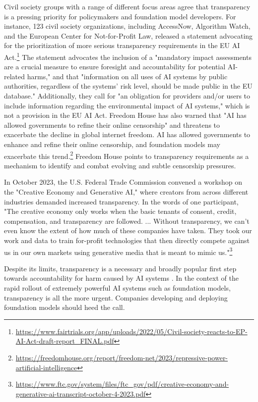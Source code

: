 \documentclass[screen, authorversion, acmsmall]{acmart}
\begin{document}
Civil society groups with a range of different focus areas agree that transparency is a pressing priority for policymakers and foundation model developers.
For instance, 123 civil society organizations, including AccessNow, Algorithm Watch, and the European Center for Not-for-Profit Law, released a statement advocating for the prioritization of more serious transparency requirements in the EU AI Act.\footnote{\url{https://www.fairtrials.org/app/uploads/2022/05/Civil-society-reacts-to-EP-AI-Act-draft-report_FINAL.pdf}}
The statement advocates the inclusion of a "mandatory impact assessments are a
crucial measure to ensure foresight and accountability for potential AI-related harms," and that "information on all uses of AI systems by public authorities, regardless of
the systems’ risk level, should be made public in the EU database." 
Additionally, they call for "an obligation for providers and/or users to include
information regarding the environmental impact of AI systems," which is not a provision in the EU AI Act.
Freedom House has also warned that "AI has allowed governments to refine their online censorship" and threatens to exacerbate the decline in global internet freedom.
AI has allowed governments to enhance and refine their online censorship, and foundation models may exacerbate this trend.\footnote{\url{https://freedomhouse.org/report/freedom-net/2023/repressive-power-artificial-intelligence}}
Freedom House points to transparency requirements as a mechanism to identify and combat evolving and subtle censorship pressures.

In October 2023, the U.S. Federal Trade Commission convened a workshop on the "Creative Economy and Generative AI," where creators from across different industries demanded increased transparency. In the words of one participant, "The creative economy only works when the basic tenants of consent, credit, compensation, and transparency are followed. ... Without transparency, we can't even know the extent of how much of these companies have taken. They took our work and data to train for-profit technologies that then directly compete against us in our own markets using generative media that is meant to mimic us."\footnote{\url{https://www.ftc.gov/system/files/ftc_gov/pdf/creative-economy-and-generative-ai-transcript-october-4-2023.pdf}} 

Despite its limits, transparency is a necessary and broadly popular first step towards accountability for harm caused by AI systems \citep{kaminski_2020, bates2023socially}. In the context of the rapid rollout of extremely powerful AI systems such as foundation models, transparency is all the more urgent. Companies developing and deploying foundation models should heed the call.
\end{document}
